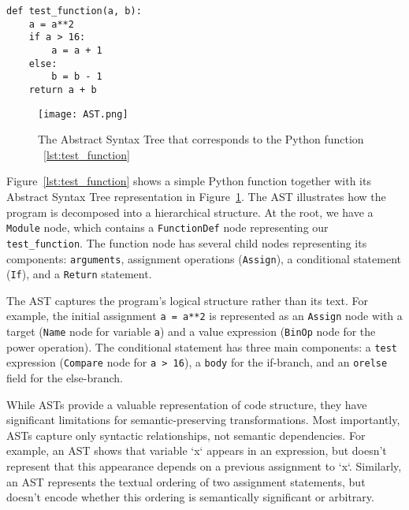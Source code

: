 \documentclass[%
thesis=student,%
coverpage=false,%
titlepage=false,%
headmarks=true, %
english,%
font=libertine, %
math=newpxtx, %
BCOR=5mm,%
coverBCOR=11mm%
]{tum-templates/book/tumbook}
\begin{document}
\begin{lstlisting}[style=pythonstyle, caption={A Python function \texttt{test\_function} that takes two parameters and demonstrates control flow with conditional statements. This function will be used to illustrate AST representation and dependency analysis in subsequent figures.}, label=lst:test_function]
def test_function(a, b):
    a = a**2
    if a > 16:
        a = a + 1
    else:
        b = b - 1
    return a + b
\end{lstlisting}


\begin{figure}[htbp]
    \centering
    \texttt{[image: AST.png]}
    \caption{The Abstract Syntax Tree that corresponds to the Python function ~\ref{lst:test_function}}
    \label{fig:AST}
\end{figure}

Figure~\ref{lst:test_function} shows a simple Python function together with its Abstract Syntax Tree representation in Figure~\ref{fig:AST}. The AST illustrates how the program is decomposed into a hierarchical structure. At the root, we have a \texttt{Module} node, which contains a \texttt{FunctionDef} node representing our \texttt{test\_function}. The function node has several child nodes representing its components: \texttt{arguments}, assignment operations (\texttt{Assign}), a conditional statement (\texttt{If}), and a \texttt{Return} statement.

The AST captures the program's logical structure rather than its text. For example, the initial assignment \texttt{a = a**2} is represented as an \texttt{Assign} node with a target (\texttt{Name} node for variable \texttt{a}) and a value expression (\texttt{BinOp} node for the power operation). The conditional statement has three main components: a \texttt{test} expression (\texttt{Compare} node for \texttt{a > 16}), a \texttt{body} for the if-branch, and an \texttt{orelse} field for the else-branch. 

While ASTs provide a valuable representation of code structure, they have significant limitations for semantic-preserving transformations. Most importantly, ASTs capture only syntactic relationships, not semantic dependencies. For example, an AST shows that variable `x` appears in an expression, but doesn't represent that this appearance depends on a previous assignment to `x`. Similarly, an AST represents the textual ordering of two assignment statements, but doesn't encode whether this ordering is semantically significant or arbitrary.
\end{document}

